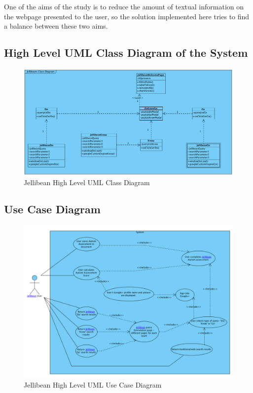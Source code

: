 \documentclass[a4paper, 11pt]{article}
\begin{document}
One of the aims of the study is to reduce the amount of textual information on the webpage presented to the user, so the solution implemented here tries to find a balance between these two aims.   

\subsection{High Level UML Class Diagram of the System}

\begin{figure}[H]
\begin{center}
\includegraphics[scale=0.45]{jBeanClassDiagram}

\caption{Jellibean High Level UML Class Diagram}
\label{jBeanClassDiagram1}
\end{center}
\end{figure}

\subsection{Use Case Diagram}
\begin{figure}[H]
\begin{center}
\includegraphics[scale=0.45]{JBeanUseCase}

\caption{Jellibean High Level UML Use Case Diagram}
\label{JBeanUseCase1}
\end{center}
\end{figure}
\end{document}
